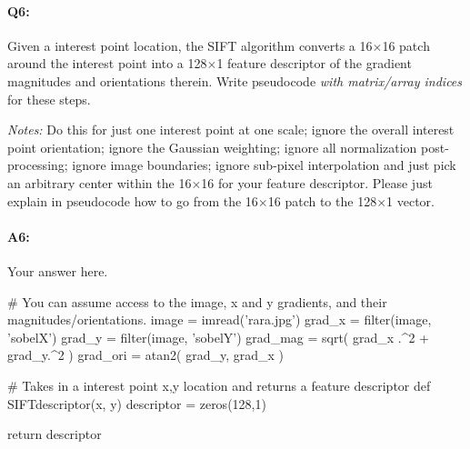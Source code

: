 







\pagebreak
\paragraph{Q6:} Given a interest point location, the SIFT algorithm converts a 16$\times$16 patch around the interest point into a 128$\times$1 feature descriptor of the gradient magnitudes and orientations therein. Write pseudocode \emph{with matrix/array indices} for these steps.

\emph{Notes:} Do this for just one interest point at one scale; ignore the overall interest point orientation; ignore the Gaussian weighting; ignore all normalization post-processing; ignore image boundaries; ignore sub-pixel interpolation and just pick an arbitrary center within the 16$\times$16 for your feature descriptor. Please just explain in pseudocode how to go from the 16$\times$16 patch to the 128$\times$1 vector.

\paragraph{A6:} Your answer here.


\begin{python}
# You can assume access to the image, x and y gradients, and their magnitudes/orientations.
image = imread('rara.jpg')
grad_x = filter(image, 'sobelX')
grad_y = filter(image, 'sobelY')
grad_mag = sqrt( grad_x .^2 + grad_y.^2 )
grad_ori = atan2( grad_y, grad_x )

# Takes in a interest point x,y location and returns a feature descriptor
def SIFTdescriptor(x, y)
    descriptor = zeros(128,1)

    return descriptor
\end{python}




%
%


